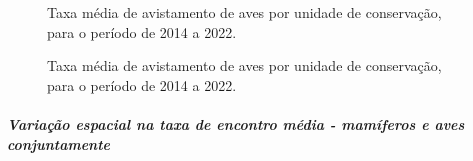 \documentclass[
  letterpaper,
]{scrbook}
\let\oldsubparagraph\subparagraph
\renewcommand{\subparagraph}[1]{\oldsubparagraph{#1}\mbox{}}
\begin{document}
\begin{figure}[H]


\caption{\label{fig-taxa-encontro-geral-mamiferos}Taxa média de
avistamento de aves por unidade de conservação, para o período de 2014 a
2022.}

\end{figure}%

\begin{figure}[H]


\caption{\label{fig-taxa-encontro-geral-aves}Taxa média de avistamento
de aves por unidade de conservação, para o período de 2014 a 2022.}

\end{figure}%

\subparagraph{Variação espacial na taxa de encontro média - mamíferos e
aves
conjuntamente}\label{variauxe7uxe3o-espacial-na-taxa-de-encontro-muxe9dia---mamuxedferos-e-aves-conjuntamente}
\end{document}
